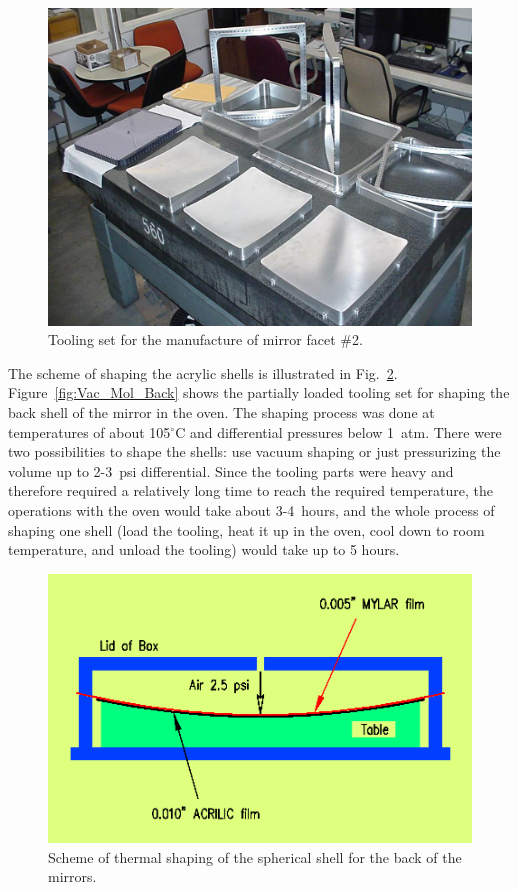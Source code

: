 \begin{figure}[ht]
    \centering
    \includegraphics[width=1.0\linewidth]{images/Tool_on_tbl.jpg}
    \caption{Tooling set for the manufacture of mirror facet \#2.}
    \label{fig:Tool_on_tbl}
\end{figure}

The scheme of shaping the acrylic shells is illustrated in  Fig.~\ref{fig:Shaping_new}. Figure~\ref{fig:Vac_Mol_Back}
shows the partially loaded tooling set for shaping the back shell of the mirror in the oven. The shaping process was
done at temperatures of about 105$^\circ$C and differential pressures below 1~atm. There were two possibilities to
shape the shells: use vacuum shaping or just pressurizing the volume up to 2-3~psi differential. Since the tooling parts
were heavy and therefore required a relatively long time to reach the required temperature, the operations with the
oven would take about 3-4~hours, and the whole process of shaping one shell (load the tooling, heat it up in the oven,
cool down to room temperature, and unload the tooling) would take up to 5 hours.

\begin{figure}[ht]
    \centering
    \includegraphics[width=1.0\linewidth]{images/Shaping_new.png}
    \caption{Scheme of thermal shaping of the spherical shell for the back of the mirrors.}
    \label{fig:Shaping_new}
\end{figure}

